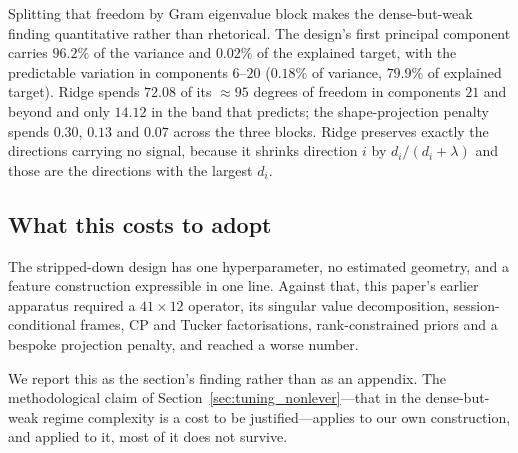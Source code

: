 Splitting that freedom by Gram eigenvalue block makes the dense-but-weak
finding quantitative rather than rhetorical. The design's first principal
component carries $96.2\%$ of the variance and $0.02\%$ of the explained
target, with the predictable variation in components $6$--$20$
($0.18\%$ of variance, $79.9\%$ of explained target). Ridge spends $72.08$ of
its $\approx 95$ degrees of freedom in components $21$ and beyond and only
$14.12$ in the band that predicts; the shape-projection penalty spends
$0.30$, $0.13$ and $0.07$ across the three blocks. Ridge preserves exactly the
directions carrying no signal, because it shrinks direction $i$ by
$d_i / (d_i + \lambda)$ and those are the directions with the largest $d_i$.

\subsection{What this costs to adopt}

The stripped-down design has one hyperparameter, no estimated geometry, and a
feature construction expressible in one line. Against that, this paper's
earlier apparatus required a $41 \times 12$ operator, its singular value
decomposition, session-conditional frames, CP and Tucker factorisations,
rank-constrained priors and a bespoke projection penalty, and reached a worse
number.

We report this as the section's finding rather than as an appendix. The
methodological claim of Section~\ref{sec:tuning_nonlever}---that in the
dense-but-weak regime complexity is a cost to be justified---applies to our own
construction, and applied to it, most of it does not survive.
